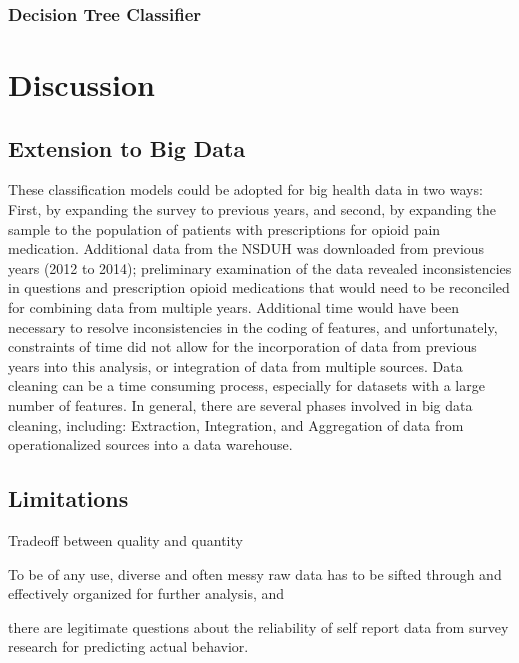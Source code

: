 \documentclass[sigconf]{acmart}
\begin{document}
\cite{vanderplas17}

\subsubsection{Decision Tree Classifier\cite{muller17}}

\section{Discussion}

\subsection{Extension to Big Data}

These classification models could be adopted for big health data in two ways: 
First, by expanding the survey to previous years, and second, by expanding the 
sample to the population of patients with prescriptions for opioid pain 
medication. Additional data from the NSDUH was downloaded from previous years 
(2012 to 2014); preliminary examination of the data revealed inconsistencies 
in questions and prescription opioid medications that would need to be 
reconciled for combining data from multiple years. Additional time would have 
been necessary to resolve inconsistencies in the coding of features, and
unfortunately, constraints of time did not allow for the incorporation of data 
from previous years into this analysis, or integration of data from multiple 
sources. Data cleaning can be a time consuming process, especially for datasets 
with a large number of features. In general, there are several phases involved 
in big data cleaning, including: Extraction, Integration, and Aggregation of 
data from operationalized sources into a data warehouse.

\subsection{Limitations}

Tradeoff between quality and quantity

To be of any use, diverse and often messy raw data has to be sifted through and 
effectively organized for further analysis, and 

there are legitimate questions about the reliability of self report data from survey
research for predicting actual behavior. 
\end{document}
